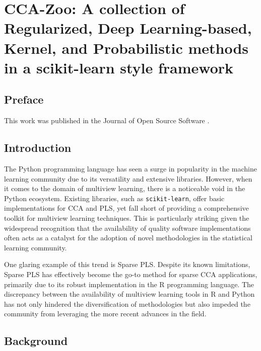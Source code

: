 \graphicspath{{chapters/software/}}


\chapter{CCA-Zoo: A collection of Regularized, Deep Learning-based, Kernel, and Probabilistic methods in a scikit-learn style framework}\label{ch:ccazoo}

\section*{Preface}

This work was published in the Journal of Open Source Software \cite{chapman2021cca}.

\section{Introduction}

The Python programming language has seen a surge in popularity in the machine learning community due to its versatility and extensive libraries.
However, when it comes to the domain of multiview learning, there is a noticeable void in the Python ecosystem.
Existing libraries, such as \texttt{scikit-learn}\cite{pedregosa2011scikit}, offer basic implementations for CCA and PLS, yet fall short of providing a comprehensive toolkit for multiview learning techniques.
This is particularly striking given the widespread recognition that the availability of quality software implementations often acts as a catalyst for the adoption of novel methodologies in the statistical learning community.

One glaring example of this trend is Sparse PLS. Despite its known limitations, Sparse PLS has effectively become the go-to method for sparse CCA applications, primarily due to its robust implementation in the R programming language.
The discrepancy between the availability of multiview learning tools in R and Python has not only hindered the diversification of methodologies but also impeded the community from leveraging the more recent advances in the field.

\section{Background}

